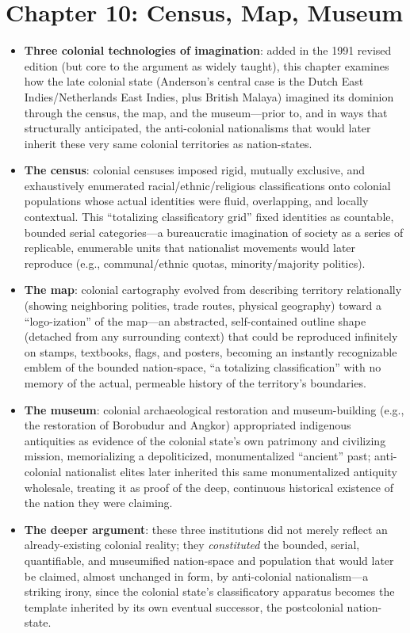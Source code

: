 \documentclass[12pt]{article}
\begin{document}
\section{Chapter 10: Census, Map, Museum}

\begin{itemize}[leftmargin=*, itemsep=4pt]
    \item \textbf{Three colonial technologies of imagination}: added in the 1991 revised edition (but core to the argument as widely taught), this chapter examines how the late colonial state (Anderson's central case is the Dutch East Indies/Netherlands East Indies, plus British Malaya) imagined its dominion through the census, the map, and the museum---prior to, and in ways that structurally anticipated, the anti-colonial nationalisms that would later inherit these very same colonial territories as nation-states.
    \item \textbf{The census}: colonial censuses imposed rigid, mutually exclusive, and exhaustively enumerated racial/ethnic/religious classifications onto colonial populations whose actual identities were fluid, overlapping, and locally contextual. This ``totalizing classificatory grid'' fixed identities as countable, bounded serial categories---a bureaucratic imagination of society as a series of replicable, enumerable units that nationalist movements would later reproduce (e.g., communal/ethnic quotas, minority/majority politics).
    \item \textbf{The map}: colonial cartography evolved from describing territory relationally (showing neighboring polities, trade routes, physical geography) toward a ``logo-ization'' of the map---an abstracted, self-contained outline shape (detached from any surrounding context) that could be reproduced infinitely on stamps, textbooks, flags, and posters, becoming an instantly recognizable emblem of the bounded nation-space, ``a totalizing classification'' with no memory of the actual, permeable history of the territory's boundaries.
    \item \textbf{The museum}: colonial archaeological restoration and museum-building (e.g., the restoration of Borobudur and Angkor) appropriated indigenous antiquities as evidence of the colonial state's own patrimony and civilizing mission, memorializing a depoliticized, monumentalized ``ancient'' past; anti-colonial nationalist elites later inherited this same monumentalized antiquity wholesale, treating it as proof of the deep, continuous historical existence of the nation they were claiming.
    \item \textbf{The deeper argument}: these three institutions did not merely reflect an already-existing colonial reality; they \emph{constituted} the bounded, serial, quantifiable, and museumified nation-space and population that would later be claimed, almost unchanged in form, by anti-colonial nationalism---a striking irony, since the colonial state's classificatory apparatus becomes the template inherited by its own eventual successor, the postcolonial nation-state.
\end{itemize}
\end{document}
